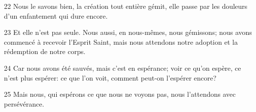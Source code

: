 
22 Nous le savons bien, la création tout entière gémit, elle passe par les douleurs d’un enfantement qui dure encore.

23 Et elle n’est pas seule. Nous aussi, en nous-mêmes, nous gémissons; nous avons commencé à recevoir l’Esprit Saint, mais nous attendons notre adoption et la rédemption de notre corps.

24 Car nous avons été sauvés, mais c’est en espérance; voir ce qu’on espère, ce n’est plus espérer: ce que l’on voit, comment peut-on l’espérer encore?

25 Mais nous, qui espérons ce que nous ne voyons pas, nous l’attendons avec persévérance.


